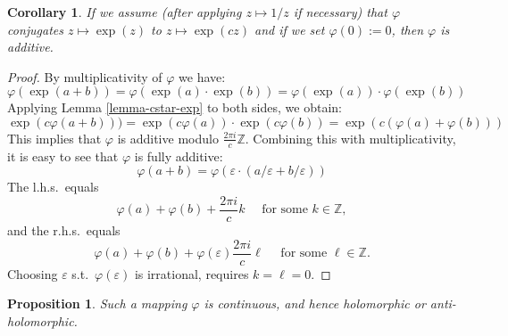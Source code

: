 \documentclass[a4paper,12pt]{amsart}
\newcommand{\ZZ}{\mathbb{Z}}
\newtheorem{corollary}[theorem]{Corollary}
\newtheorem{proposition}[theorem]{Proposition}
\theoremstyle{definition}
\begin{document}
\begin{corollary}
If we assume (after applying $z \mapsto 1/z$ if necessary) that $\varphi$ conjugates $z \mapsto \exp(z)$ to $z \mapsto \exp(c z)$ and if we set $\varphi(0) := 0$, then $\varphi$ is additive.
\end{corollary}
\begin{proof}
By multiplicativity of $\varphi$ we have:
\[
\varphi(\exp(a + b)) = \varphi(\exp(a)\cdot\exp(b)) = \varphi(\exp(a))\cdot\varphi(\exp(b)) 
\]
Applying Lemma \ref{lemma-cstar-exp} to both sides, we obtain:
\[
\exp(c\varphi(a + b))) = \exp(c\varphi(a))\cdot\exp(c\varphi(b)) = \exp(c(\varphi(a)+ \varphi(b)))
\]
This implies that $\varphi$ is additive modulo $\frac{2\pi i}{c} \ZZ$. Combining this with multiplicativity, it is easy to see that $\varphi$ is fully additive:
\[
\varphi(a+b) = \varphi(\varepsilon \cdot (a/\varepsilon + b/\varepsilon))
\]
The l.h.s.\ equals
\[\varphi(a) + \varphi(b) + \frac{2 \pi i}{c} k \quad \text{ for some } k \in \ZZ
,\] and the r.h.s.\ equals
\[
\varphi(a) + \varphi(b) + \varphi(\varepsilon) \frac{2 \pi i}{c} \ell \quad \text{ for some } \ell \in \ZZ.
\]
Choosing $\varepsilon$ s.t.\ $\varphi(\varepsilon)$ is irrational, requires $k = \ell  = 0$.
\end{proof}

\begin{proposition}
\label{prop-Cstar}
Such a mapping $\varphi$ is continuous, and hence holomorphic or anti-holomorphic.
\end{proposition}
\end{document}
